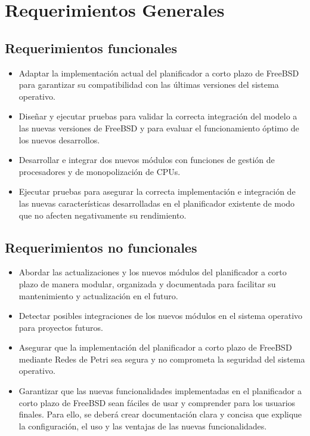 \section{Requerimientos Generales}

\subsection{Requerimientos funcionales}
\begin{itemize}
    \item Adaptar la implementación actual del planificador a corto plazo de FreeBSD para garantizar su compatibilidad con las últimas versiones del sistema operativo.
    \item Diseñar y ejecutar pruebas para validar la correcta integración del modelo a las nuevas versiones de FreeBSD y para evaluar el funcionamiento óptimo de los nuevos desarrollos.
    \item Desarrollar e integrar dos nuevos módulos con funciones de gestión de procesadores y de monopolización de CPUs.
    \item Ejecutar pruebas para asegurar la correcta implementación e integración de las nuevas características desarrolladas en el planificador existente de modo que no afecten negativamente su rendimiento.
\end{itemize}

\subsection{Requerimientos no funcionales}
\begin{itemize}
    \item Abordar las actualizaciones y los nuevos módulos del planificador a corto plazo de manera modular, organizada y documentada para facilitar su mantenimiento y actualización en el futuro.
    \item Detectar posibles integraciones de los nuevos módulos en el sistema operativo para proyectos futuros.
    \item Asegurar que la implementación del planificador a corto plazo de FreeBSD mediante Redes de Petri sea segura y no comprometa la seguridad del sistema operativo.
    \item Garantizar que las nuevas funcionalidades implementadas en el planificador a corto plazo de FreeBSD sean fáciles de usar y comprender para los usuarios finales. Para ello, se deberá crear documentación clara y concisa que explique la configuración, el uso y las ventajas de las nuevas funcionalidades.
\end{itemize}
